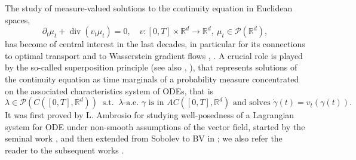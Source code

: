 \documentclass[10pt,leqno]{amsart}
\numberwithin{equation}{section}
\newcommand{\R}{\mathbb{R}}
\newcommand{\PP}{\mathcal{P}}
\begin{document}
The study of measure-valued solutions to the continuity equation in Euclidean spaces, 
\begin{equation}\label{eq: 1}
    \partial_t \mu_t + \operatorname{div}(v_t\mu_t) = 0, \quad v:[0,T]\times \R^d \to \R^d, \ \mu_t\in \PP(\R^d), 
\end{equation}
has become of central interest in the last decades, in particular for its connections to optimal transport \cite{benamou2000computational} and to Wasserstein gradient flows \cite{jordan1998variational}, \cite{ambrosio2005gradient}. A crucial role is played by the so-called superposition principle \cite{ambrosio2004transport} (see also \cite{ambrosio2005gradient}, \cite{ambrosio2014continuity}), that represents solutions of the continuity equation as time marginals of a probability measure concentrated on the associated characteristics system of ODEs, that is 
\begin{equation}\label{eq: 2}
    \lambda \in \PP(C([0,T],\R^d)) \ \text{ s.t. } \ \lambda\text{-a.e. } \gamma \text{ is in } AC([0,T],\R^d) \text{ and solves }\dot{\gamma}(t) = v_t(\gamma(t)).
\end{equation}
It was first proved by L. Ambrosio for studying well-posedness of a Lagrangian system for ODE under non-smooth assumptions of the vector field, started by the seminal work \cite{diperna1989cauchy}, and then extended from Sobolev to BV in \cite{ambrosio2004transport}; we also refer the reader to the subsequent works \cite{crippa2008estimates, brue2021positive, brue2024sharp}. 
\end{document}
